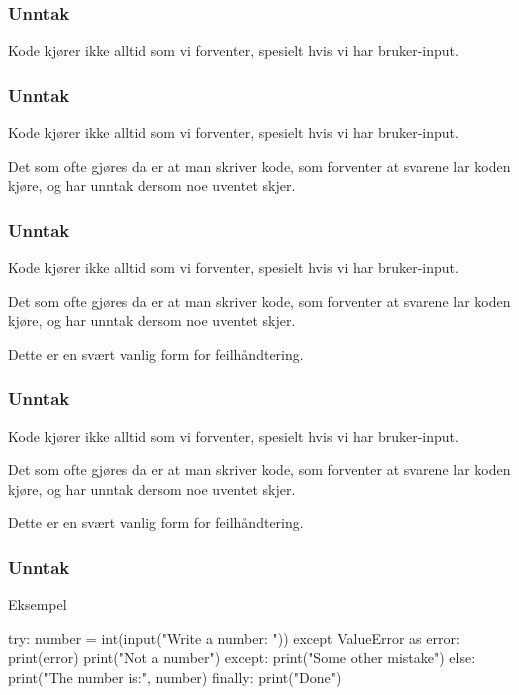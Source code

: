 
\begin{frame}
    \frametitle{Unntak}

    Kode kjører ikke alltid som vi forventer, spesielt hvis vi har bruker-input. 

\end{frame}

\begin{frame}
    \frametitle{Unntak}

    Kode kjører ikke alltid som vi forventer, spesielt hvis vi har bruker-input. 

    Det som ofte gjøres da er at man skriver kode, som forventer at svarene lar koden kjøre, og har unntak dersom noe uventet skjer. 

\end{frame}

\begin{frame}
    \frametitle{Unntak}

    Kode kjører ikke alltid som vi forventer, spesielt hvis vi har bruker-input. 

    Det som ofte gjøres da er at man skriver kode, som forventer at svarene lar koden kjøre, og har unntak dersom noe uventet skjer. 

    Dette er en svært vanlig form for feilhåndtering. 

\end{frame}

\begin{frame}
    \frametitle{Unntak}

    Kode kjører ikke alltid som vi forventer, spesielt hvis vi har bruker-input. 

    Det som ofte gjøres da er at man skriver kode, som forventer at svarene lar koden kjøre, og har unntak dersom noe uventet skjer. 

    Dette er en svært vanlig form for feilhåndtering. 

\end{frame}

\begin{frame}[fragile]
    \frametitle{Unntak}

    Eksempel

\begin{python}
try:
    number = int(input("Write a number: "))
except ValueError as error: 
    print(error)
    print("Not a number")
except: 
    print("Some other mistake")
else:
    print("The number is:", number)
finally:
    print("Done")
\end{python}

\end{frame}

